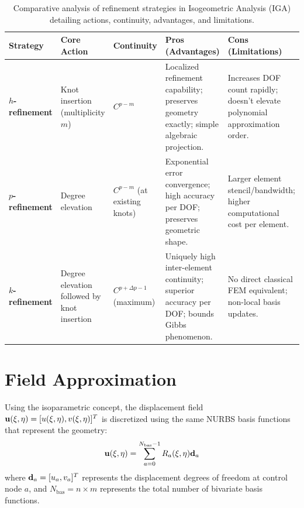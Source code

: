 \begin{table}[htbp]
    \centering
    \caption{Comparative analysis of refinement strategies in Isogeometric Analysis (IGA) detailing actions, continuity, advantages, and limitations.}
    \label{tab:refinement_comparison}
    \small
    \begin{tabular}{p{2.0cm}p{1.8cm}p{1.8cm}p{3.4cm}p{3.4cm}}
        \toprule
        \textbf{Strategy}       & \textbf{Core Action}                        & \textbf{Continuity}            & \textbf{Pros (Advantages)}                                                                  & \textbf{Cons (Limitations)}                                                  \\
        \midrule
        \textbf{$h$-refinement} & Knot insertion (multiplicity $m$)           & $C^{p-m}$                      & Localized refinement capability; preserves geometry exactly; simple algebraic projection.   & Increases DOF count rapidly; doesn't elevate polynomial approximation order. \\
        \addlinespace
        \textbf{$p$-refinement} & Degree elevation                            & $C^{p-m}$ (at existing knots)  & Exponential error convergence; high accuracy per DOF; preserves geometric shape.            & Larger element stencil/bandwidth; higher computational cost per element.     \\
        \addlinespace
        \textbf{$k$-refinement} & Degree elevation followed by knot insertion & $C^{p+\Delta p - 1}$ (maximum) & Uniquely high inter-element continuity; superior accuracy per DOF; bounds Gibbs phenomenon. & No direct classical FEM equivalent; non-local basis updates.                 \\
        \bottomrule
    \end{tabular}
\end{table}

\newpage



\section{Field Approximation}
Using the isoparametric concept, the displacement field $\mathbf{u}(\xi, \eta) = [u(\xi, \eta), v(\xi, \eta)]^T$ is discretized using the same NURBS basis functions that represent the geometry:
\begin{equation}
    \mathbf{u}(\xi, \eta) = \sum_{a=0}^{N_{\text{bas}}-1} R_a(\xi, \eta) \mathbf{d}_a
\end{equation}
where $\mathbf{d}_a = [u_a, v_a]^T$ represents the displacement degrees of freedom at control node $a$, and $N_{\text{bas}} = n \times m$ represents the total number of bivariate basis functions.

